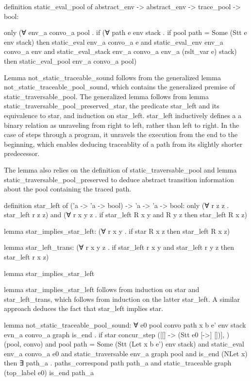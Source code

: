 definition static_eval_pool of abstract_env -> abstract_env -> trace_pool -> bool:

only
(∀ env_a convo_a pool .
  if
    (∀ path e env stack . if pool path = Some (Stt e env stack) then 
      static_eval env_a convo_a e and
      static_eval_env env_a convo_a env and
      static_eval_stack env_a convo_a env_a (rslt_var e) stack)
  then 
    static_eval_pool env_a convo_a pool)

Lemma not_static_traceable_sound follows from the generalized lemma
not_static_traceable_pool_sound, which contains the generalized premise of
static_traversable_pool. The generalized lemma follows from lemma
static_traversable_pool_preserved_star, the predicate star_left and its equivalence to star,
and induction on star_left. star_left inductively defines a a binary relation as unraveling
from right to left, rather than left to right.  In the case of steps through a program, it
unravels the execution from the end to the beginning, which enables deducing traceablity of a
path from its slightly shorter predecessor.  

The lemma also relies on the definition of static_traversable_pool
and lemma static_traversable_pool_preserved to deduce abstract transition information about the
pool containing the traced path.

definition star_left of ('a -> 'a -> bool) -> 'a -> 'a -> bool:
only
(∀ r z z .
  star_left r z z) and
(∀ r x y z .
  if
    star_left R x y and R y z
  then
    star_left R x z)

lemma star_implies_star_left:
(∀ r x y .
  if
    star R x z
  then
    star_left R x z)


lemma star_left_trans:
(∀ r x y z .
  if 
    star_left r x y and
    star_left r y z 
  then
    star_left r x z)

lemma star_implies_star_left 

lemma star_implies_star_left follows from induction on star and star_left_trans,
which follows from induction on the latter star_left.  A similar approach deduces the
fact that star_left implies star.


lemma not_static_traceable_pool_sound:
∀ e0 pool convo path x b e' env stack evn_a convo_a graph is_end .
  if
    star concur_step ([[] -> (Stt e0 [->] [])], {}) (pool, convo) and 
    pool path = Some (Stt (Let x b e') env stack) and 
    static_eval env_a convo_a e0 and 
    static_traversable env_a graph pool and 
    is_end (NLet x)
  then
    ∃ path_a . 
      paths_correspond path path_a and 
      static_traceable graph (top_label e0) is_end path_a

